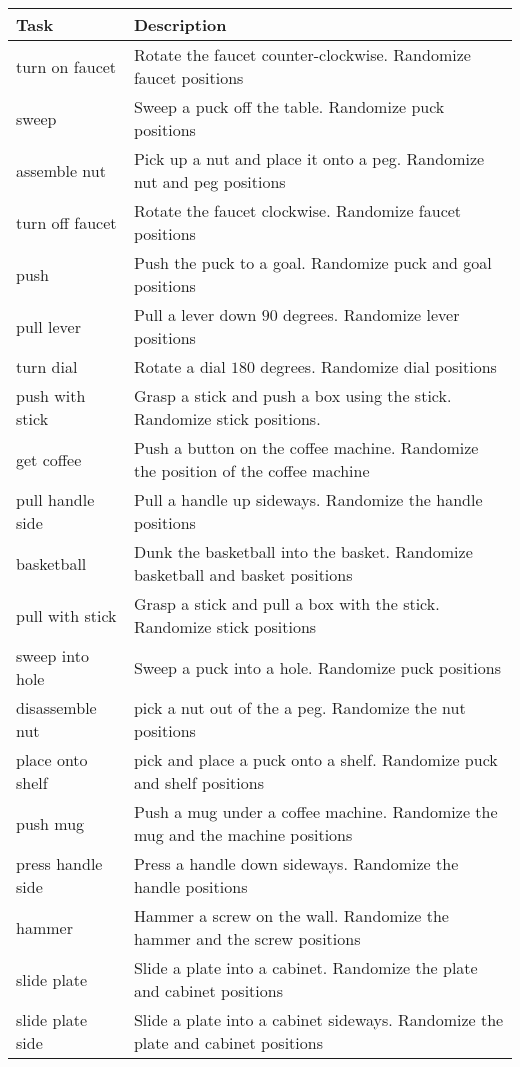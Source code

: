 \begin{table}[h]
\footnotesize
    \centering
    \begin{tabular}{ll}
\toprule
 Task & Description  \\
\midrule
turn on faucet & Rotate the faucet counter-clockwise. Randomize faucet positions \\
sweep & Sweep a puck off the table. Randomize puck positions\\
assemble nut & Pick up a nut and place it onto a peg. Randomize nut and peg positions\\
turn off faucet & Rotate the faucet clockwise. Randomize faucet positions\\
push & Push the puck to a goal. Randomize puck and goal positions\\
pull lever & Pull a lever down $90$ degrees. Randomize lever positions\\
turn dial & Rotate a dial $180$ degrees. Randomize dial positions\\
push with stick & Grasp a stick and push a box using the stick. Randomize stick positions.\\
get coffee & Push a button on the coffee machine. Randomize the position of the coffee machine\\
pull handle side & Pull a handle up sideways. Randomize the handle positions\\
basketball & Dunk the basketball into the basket. Randomize basketball and basket positions\\
pull with stick & Grasp a stick and pull a box with the stick. Randomize stick positions\\
sweep into hole & Sweep a puck into a hole. Randomize puck positions\\
disassemble nut & pick a nut out of the a peg. Randomize the nut positions\\
place onto shelf & pick and place a puck onto a shelf. Randomize puck and shelf positions\\
push mug & Push a mug under a coffee machine. Randomize the mug and the machine positions\\
press handle side & Press a handle down sideways. Randomize the handle positions\\
hammer & Hammer a screw on the wall. Randomize the hammer and the screw positions\\
slide plate & Slide a plate into a cabinet. Randomize the plate and cabinet positions\\
slide plate side & Slide a plate into a cabinet sideways. Randomize the plate and cabinet positions\\

\end{tabular}
\end{table}
